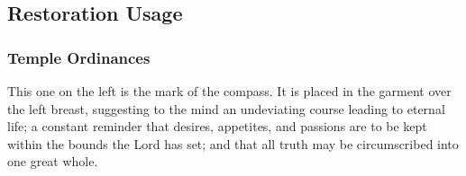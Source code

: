 
\subsection{Restoration Usage} %
	\label{TRUTH-RESTORATION}

	
		
	\subsubsection{Temple Ordinances}
		\label{TRUTH-TEMPLE}
	
		\begin{compactdesc}
			\item[{\hyperref[TEMPLE-ENDOWMENT-ENDOW-PRE-1990-VEIL]{Discussion of garment symbols}}] This one on the left is the mark of the compass. It is placed in the garment over the left breast, suggesting to the mind an undeviating course leading to eternal life; a constant reminder that desires, appetites, and passions are to be kept within the bounds the Lord has set; and that all truth may be circumscribed into one great whole.
		\end{compactdesc}
	
	
	
